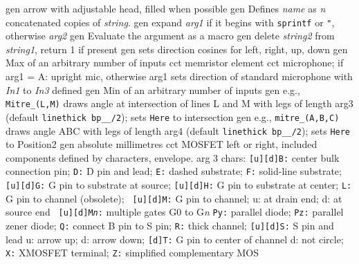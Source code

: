   {gen}
  {arrow with adjustable head, filled when possible}
  {gen}
  {Defines {\sl name} as {\sl n} concatenated copies of {\sl
  string}.}
  {gen}
  {expand {\sl arg1} if it begins
    with {\tt sprintf} or {\tt "}, otherwise {\sl arg2}}
  {gen}
  {Evaluate the argument as a macro}
  {gen}
  {delete {\sl string2} from {\sl string1}, return 1 if present}
  {gen}
  {sets direction cosines for left, right, up, down}
  {gen}
  {Max of an arbitrary number of inputs}
  {cct}
  {memristor element}
  {cct}
  {microphone; if arg1 = A: upright mic, otherwise arg1 sets
  direction
   of standard microphone with {\sl In1} to {\sl In3} defined
   }
  {gen}
  {Min of an arbitrary number of inputs}
  {gen}
  {e.g., {\tt Mitre\_(L,M)} draws angle at intersection of lines
   L and M with legs of length arg3 (default {\tt linethick bp\_\_/2});
   sets {\tt Here} to intersection
    }
  {gen}
  {e.g., {\tt mitre\_(A,B,C)} draws angle ABC with legs
   of length arg4 (default {\tt linethick bp\_\_/2}); sets {\tt Here}
   to Position2
    }
  {gen}
  {absolute millimetres}
  {cct}
  {MOSFET left or right, included components defined by characters,
  envelope.
   arg 3 chars:
      {\tt [u][d]B:} center bulk connection pin; {\tt D:} D pin and lead;
      {\tt E:} dashed substrate; {\tt F:} solid-line substrate; {\tt
      [u][d]G:} G pin to substrate at source; {\tt [u][d]H:} G pin to
      substrate at center; {\tt L:} G pin to channel (obsolete); {\tt
      [u][d]M:} G pin to channel; u: at drain end; d: at source end {\tt
      [u][d]M{\sl n}:} multiple gates G0 to G{\sl n} {\tt Py:} parallel
      diode; {\tt Pz:} parallel zener diode; {\tt Q:} connect B pin to
      S pin; {\tt R:} thick channel; {\tt [u][d]S:} S pin and lead u:
      arrow up; d: arrow down; {\tt [d]T:} G pin to center of channel
      d: not circle; {\tt X:} XMOSFET terminal; {\tt Z:} simplified
      complementary MOS
    }
